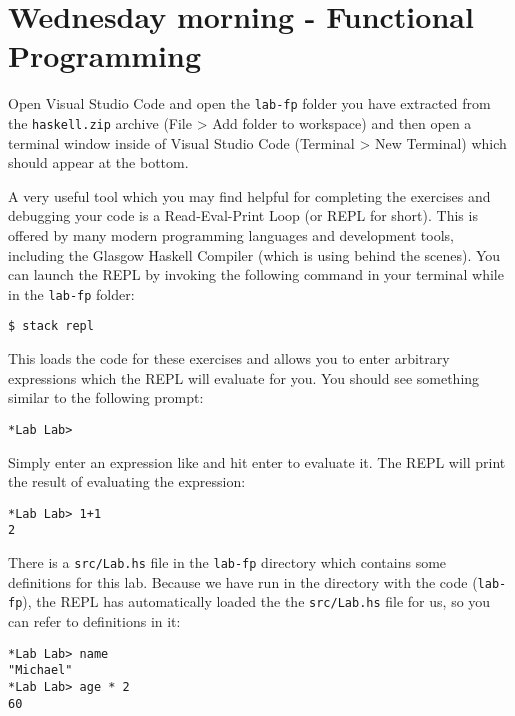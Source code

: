 \section{Wednesday morning - Functional Programming}

Open Visual Studio Code and open the \texttt{\small lab-fp} folder you have extracted from the \texttt{haskell.zip} archive (File > Add folder to workspace) and then open a terminal window inside of Visual Studio Code (Terminal > New Terminal) which should appear at the bottom. 

A very useful tool which you may find helpful for completing the exercises and debugging your code is a Read-Eval-Print Loop (or REPL for short). This is offered by many modern programming languages and development tools, including the Glasgow Haskell Compiler (which  is using behind the scenes). You can launch the REPL by invoking the following command in your terminal while in the \texttt{\small lab-fp} folder:
\begin{verbatim}
$ stack repl
\end{verbatim}
This loads the code for these exercises and allows you to enter arbitrary expressions which the REPL will evaluate for you. You should see something similar to the following prompt:
\begin{verbatim}
*Lab Lab>
\end{verbatim}
Simply enter an expression like  and hit enter to evaluate it. The REPL will print the result of evaluating the expression:
\begin{verbatim}
*Lab Lab> 1+1
2
\end{verbatim}
There is a \texttt{\small src/Lab.hs} file in the \texttt{\small lab-fp} directory which contains some definitions for this lab. Because we have run  in the directory with the code (\texttt{\small lab-fp}), the REPL has automatically loaded the the \texttt{\small src/Lab.hs} file for us, so you can refer to definitions in it:
\begin{verbatim}
*Lab Lab> name
"Michael"
*Lab Lab> age * 2
60
\end{verbatim}


